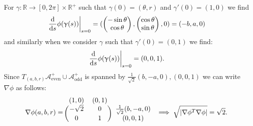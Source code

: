 \documentclass{article}
\newcommand{\aeven}{\mathcal{A}_{\mathrm{even}}^+}
\newcommand{\aodd}{\mathcal{A}_{\mathrm{odd}}^+}
\newcommand{\ud}{\mathrm{d}}
\newcommand{\dby}[1]{\frac{\ud}{\ud #1}}
\begin{document}
For $\gamma : \mathbb{R} \to [0, 2\pi] \times \mathbb{R}^+$ such that $\gamma(0) = (\theta, r)$ and $\gamma'(0) = (1, 0)$ we find
$$
\left. \dby{s} \phi(\gamma(s)) \right|_{s=0} = \parens{\begin{pmatrix} -\sin \theta \\ \cos \theta \end{pmatrix}, \begin{pmatrix} \cos \theta \\ \sin\theta \end{pmatrix}, 0} = \parens{-b, a, 0}
$$
and similarly when we consider $\gamma$ such that $\gamma'(0) = (0, 1)$ we find:
$$
\left. \dby{s} \phi(\gamma(s)) \right|_{s=0} = \parens{ 0, 0, 1 }.
$$
Since $T_{(a, b, r)} \aeven \cup \aodd$ is spanned by $\frac{1}{\sqrt{2}} (b, -a, 0), (0, 0, 1)$ we can write $\nabla \phi$ as follows:
$$
\nabla \phi (a, b, r) = \begin{blockarray}{ccc}
  (1, 0) & (0, 1) \\
  \begin{block}{(cc)c}
    -\sqrt{2} & 0 & \frac{1}{\sqrt{2}} (b, -a, 0) \\
    0 & 1 & (0, 0, 1)  \\
  \end{block}
\end{blockarray} \implies \sqrt{\abs{\nabla \phi^T \nabla \phi}} = \sqrt{2}.
$$
\end{document}
